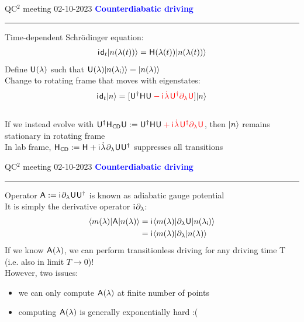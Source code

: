 \documentclass{beamer}
\def\gemph#1{{\color{mygreen}#1}}
\def\lbt{\small QC$^2$ meeting 02-10-2023} %
\def\mt#1{\kern0.025em\mathsf{#1}\kern0.025em}
\def\d{\mathsf d}
\def\i{\mathsf i}
\def\lambdai{\lambda_{\sf i}}
\def\A{\mt A}
\def\H{\mt H}
\def\HCD{\mt H_{\sf CD}}
\def\U{\mt U}
\def\+{\kern0.0833em}
\newenvironment{dia}[2]
{
	\begin{frame}
	\vspace{1mm}
	{\small #1}
	\hfill
    {\small\bf\textcolor{blue}{#2}}
	\vspace{3mm}
	\hrule
	\bigskip
}
{
	\vfill
	\end{frame}
}
\begin{document}
\begin{dia}{\lbt}{Counterdiabatic driving}
Time-dependent Schr\"odinger equation:
\begin{align*}
    \i \+ \d_t \ket{n(\lambda(t))} = \H(\lambda(t)) \ket{n(\lambda(t))}
\end{align*} \pause
Define $\U(\lambda)$ such that $\U(\lambda) \ket{n(\lambdai)} = \ket{n(\lambda)}$ \pause \\[4mm]
Change to rotating frame that moves with eigenstates:
\begin{align*}
    \i \+ \d_t \ket{n} = [\mt U\t \mt H \mt U {\color{red} {} - \i \+ \dot\lambda \+ \mt U\t \partial_\lambda \mt U}] \ket{n}
\end{align*}
$ $ \pause \\[-2mm]
If we instead evolve with $\U\t\HCD\U := \U\t\H\U {\color{red} {} + \i \+ \dot\lambda \+ \mt U\t \partial_\lambda \mt U}$, then ${|n\rangle}$ remains \gemph{stationary} in rotating frame \pause \\[4mm]
In lab frame, $\HCD := \H + \i \+ \dot\lambda \+ \partial_\lambda \mt U \mt U\t$ suppresses all transitions
\vspace{-1cm}
\end{dia}

\begin{dia}{\lbt}{Counterdiabatic driving}
Operator $\A := \i \+ \partial_\lambda \mt U \mt U\t$ is known as \gemph{adiabatic gauge potential} \pause \\[4mm]
It is simply the derivative operator $\i \+ \partial_\lambda$:
\begin{align*}
    \bra{m(\lambda)} \mt A \ket{n(\lambda)} &= \i \+ \bra{m(\lambda)} \partial_\lambda \mt U \ket{n(\lambdai)} \\
    &= \i \+ \bra{m(\lambda)} \partial_\lambda \ket{n(\lambda)}
\end{align*} \pause
If we know $\A(\lambda)$, we can perform \gemph{transitionless} driving for \gemph{any driving time T} (i.e. also in limit $T\to0$)! \pause \\[4mm]
However, two issues: \pause
\begin{itemize}
    \item we can only compute $\mt A(\lambda)$ at finite number of points \pause
    \item computing $\mt A(\lambda)$ is generally exponentially hard :(
\end{itemize}
\vspace{-1cm}
\end{dia}
\end{document}
